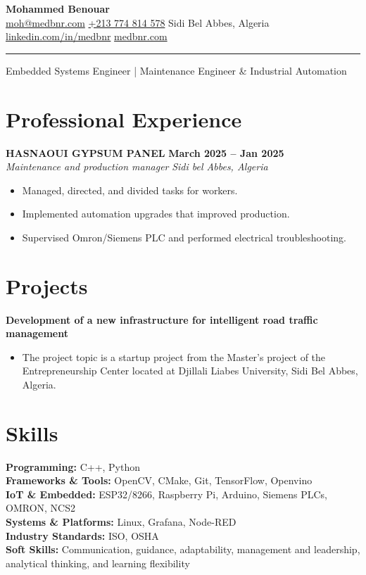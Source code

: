 \documentclass[11pt,a4paper]{article}
\begin{document}
\noindent
{\LARGE \textbf{Mohammed Benouar}} \\[0.3em]
\href{mailto:moh@medbnr.com}{moh@medbnr.com} \textbar{} 
\href{tel:+213774814578}{+213 774 814 578} \textbar{} 
Sidi Bel Abbes, Algeria \textbar{} 
\href{https://www.linkedin.com/in/medbnr/}{linkedin.com/in/medbnr} \textbar{} 
\href{https://medbnr.com}{medbnr.com}
\\[-.5em]\rule{\textwidth}{0.1pt}
Embedded Systems Engineer | Maintenance Engineer \& Industrial Automation




\section*{Professional Experience}
\textbf{HASNAOUI GYPSUM PANEL}
\hfill
\textbf{March 2025 – Jan 2025}
\\
\hfill
\textit{Maintenance and production manager}
\hfill
\textit{Sidi bel Abbes, Algeria}
\begin{itemize}[leftmargin=1.5em, nosep]
  \item Managed, directed, and divided tasks for workers.
  \item Implemented automation upgrades that improved production.
  \item Supervised Omron/Siemens PLC and performed electrical troubleshooting.
  
\end{itemize}

\section*{Projects}
\textbf{Development of a new infrastructure for intelligent road traffic management}
\begin{itemize}[leftmargin=1.5em, nosep]
  \item The project topic is a startup project from the Master's project of the Entrepreneurship Center located at Djillali Liabes University, Sidi Bel Abbes, Algeria.
\end{itemize}




\section*{Skills}
\textbf{Programming:} C++, Python \\
\textbf{Frameworks \& Tools:}  OpenCV, CMake, Git, TensorFlow, Openvino \\
\textbf{IoT \& Embedded:} ESP32/8266, Raspberry Pi, Arduino, Siemens PLCs, OMRON, NCS2  \\
\textbf{Systems \& Platforms:} Linux, Grafana, Node-RED \\
\textbf{Industry Standards:} ISO, OSHA\\
\textbf{Soft Skills:} Communication, guidance, adaptability, management and leadership, analytical thinking, and learning flexibility
\end{document}

